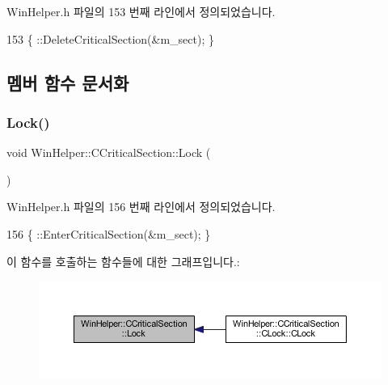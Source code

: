 Win\+Helper.\+h 파일의 153 번째 라인에서 정의되었습니다.


\begin{DoxyCode}
153 \{ ::DeleteCriticalSection(&m\_sect); \}
\end{DoxyCode}


\subsection{멤버 함수 문서화}
\mbox{\label{class_win_helper_1_1_c_critical_section_aa0c20ee0e7de698b37c26a295d0f45fe}} 
\subsubsection{\texorpdfstring{Lock()}{Lock()}}
{\footnotesize\ttfamily void Win\+Helper\+::\+C\+Critical\+Section\+::\+Lock (\begin{DoxyParamCaption}{ }\end{DoxyParamCaption})\hspace{0.3cm}{\ttfamily [inline]}}



Win\+Helper.\+h 파일의 156 번째 라인에서 정의되었습니다.


\begin{DoxyCode}
156 \{ ::EnterCriticalSection(&m\_sect); \}
\end{DoxyCode}
이 함수를 호출하는 함수들에 대한 그래프입니다.\+:
\nopagebreak
\begin{figure}[H]
\begin{center}
\leavevmode
\includegraphics[width=350pt]{class_win_helper_1_1_c_critical_section_aa0c20ee0e7de698b37c26a295d0f45fe_icgraph}
\end{center}
\end{figure}
\mbox{\label{class_win_helper_1_1_c_critical_section_a32b6fc61701020c400f3bb9b5e00bf12}} 

